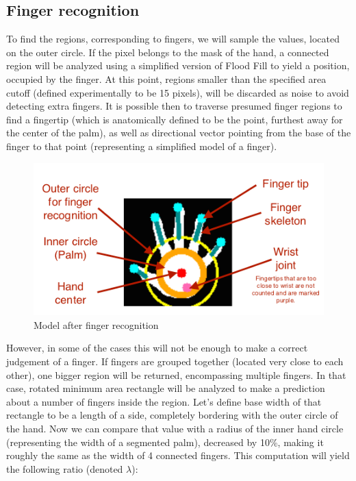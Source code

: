 \documentclass[a4paper,11pt,oneside]{article}
\begin{document}
\subsection{Finger recognition}

To find the regions, corresponding to fingers, we will sample the values, located on the outer circle. If the pixel belongs to the mask of the hand, a connected region will be analyzed using a simplified version of Flood Fill to yield a position, occupied by the finger. At this point, regions smaller than the specified area cutoff (defined experimentally to be 15 pixels), will be discarded as noise to avoid detecting extra fingers. It is possible then to traverse presumed finger regions to find a fingertip (which is anatomically defined to be the point, furthest away for the center of the palm), as well as directional vector pointing from the base of the finger to that point (representing a simplified model of a finger).\\

\begin{figure}[H]
\centering
\includegraphics[scale=1.4]{hand-recognized.png}
\caption{Model after finger recognition}
\end{figure}

However, in some of the cases this will not be enough to make a correct judgement of a finger. If fingers are grouped together (located very close to each other), one bigger region will be returned, encompassing multiple fingers. In that case, rotated minimum area rectangle will be analyzed to make a prediction about a number of fingers inside the region. Let's define base width of that rectangle to be a length of a side, completely bordering with the outer circle of the hand. Now we can compare that value with a radius of the inner hand circle (representing the width of a segmented palm), decreased by 10\%, making it roughly the same as the width of 4 connected fingers. This computation will yield the following ratio (denoted $\lambda$):
\end{document}
